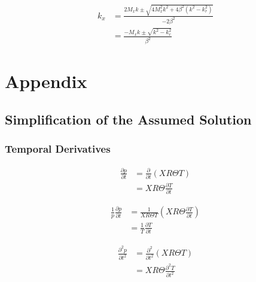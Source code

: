 





\begin{align*}
    k_x &= \frac{2M_x k \pm \sqrt{4 M_x^2 k^2 + 4 \beta^2 \left( k^2 - k_r^2 \right)}}{-2\beta^2}\\
        &= \frac{-M_x k \pm \sqrt{k^2 - k_r^2}}{\beta^2}
\end{align*}

\section{Appendix}
\subsection{Simplification of the Assumed Solution}
\subsubsection{Temporal Derivatives}

\begin{align*}
    \frac{\partial p}{\partial t} 
    &=
    \frac{\partial }{\partial t}  \left( XR\Theta T \right) \\
    &=
    XR\Theta\frac{\partial T}{\partial t}  
\end{align*}


\begin{align*}
    \frac{1}{p}\frac{\partial p}{\partial t} 
    &=
    \frac{ 1}{X R \Theta T}  \left( XR\Theta\frac{\partial T}{\partial t} \right) \\
    &=\frac{ 1}{ T}\frac{\partial T}{\partial t}  
\end{align*}

\begin{align*}
    \frac{\partial^2 p}{\partial t^2} 
    &=
    \frac{\partial^2 }{\partial t^2}  \left( XR\Theta T \right) \\
    &=
    XR\Theta\frac{\partial^2 T}{\partial t^2}  
\end{align*}


